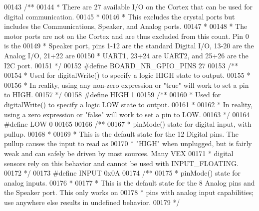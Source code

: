 \begin{DoxyCode}
00143 \textcolor{comment}{/**}
00144 \textcolor{comment}{ * There are 27 available I/O on the Cortex that can be used for digital communication.}
00145 \textcolor{comment}{ *}
00146 \textcolor{comment}{ * This excludes the crystal ports but includes the Communications, Speaker, and Analog ports.}
00147 \textcolor{comment}{ *}
00148 \textcolor{comment}{ * The motor ports are not on the Cortex and are thus excluded from this count. Pin 0 is the}
00149 \textcolor{comment}{ * Speaker port, pins 1-12 are the standard Digital I/O, 13-20 are the Analog I/O, 21+22 are}
00150 \textcolor{comment}{ * UART1, 23+24 are UART2, and 25+26 are the I2C port.}
00151 \textcolor{comment}{ */}
00152 \textcolor{preprocessor}{#}\textcolor{preprocessor}{define} \textcolor{preprocessor}{BOARD\_NR\_GPIO\_PINS} 27
00153 \textcolor{comment}{/**}
00154 \textcolor{comment}{ * Used for digitalWrite() to specify a logic HIGH state to output.}
00155 \textcolor{comment}{ *}
00156 \textcolor{comment}{ * In reality, using any non-zero expression or "true" will work to set a pin to HIGH.}
00157 \textcolor{comment}{ */}
00158 \textcolor{preprocessor}{#}\textcolor{preprocessor}{define} \textcolor{preprocessor}{HIGH} 1
00159 \textcolor{comment}{/**}
00160 \textcolor{comment}{ * Used for digitalWrite() to specify a logic LOW state to output.}
00161 \textcolor{comment}{ *}
00162 \textcolor{comment}{ * In reality, using a zero expression or "false" will work to set a pin to LOW.}
00163 \textcolor{comment}{ */}
00164 \textcolor{preprocessor}{#}\textcolor{preprocessor}{define} \textcolor{preprocessor}{LOW} 0
00165 
00166 \textcolor{comment}{/**}
00167 \textcolor{comment}{ * pinMode() state for digital input, with pullup.}
00168 \textcolor{comment}{ *}
00169 \textcolor{comment}{ * This is the default state for the 12 Digital pins. The pullup causes the input to read as}
00170 \textcolor{comment}{ * "HIGH" when unplugged, but is fairly weak and can safely be driven by most sources. Many VEX}
00171 \textcolor{comment}{ * digital sensors rely on this behavior and cannot be used with INPUT\_FLOATING.}
00172 \textcolor{comment}{ */}
00173 \textcolor{preprocessor}{#}\textcolor{preprocessor}{define} \textcolor{preprocessor}{INPUT} 0x0A
00174 \textcolor{comment}{/**}
00175 \textcolor{comment}{ * pinMode() state for analog inputs.}
00176 \textcolor{comment}{ *}
00177 \textcolor{comment}{ * This is the default state for the 8 Analog pins and the Speaker port. This only works on}
00178 \textcolor{comment}{ * pins with analog input capabilities; use anywhere else results in undefined behavior.}
00179 \textcolor{comment}{ */}

\end{DoxyCode}
